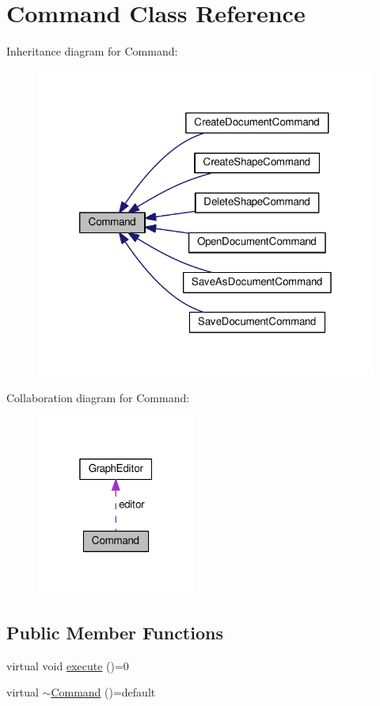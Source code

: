 \hypertarget{class_command}{\section{Command Class Reference}
\label{class_command}
}


Inheritance diagram for Command\-:
\nopagebreak
\begin{figure}[H]
\begin{center}
\leavevmode
\includegraphics[width=320pt]{class_command__inherit__graph}
\end{center}
\end{figure}


Collaboration diagram for Command\-:
\nopagebreak
\begin{figure}[H]
\begin{center}
\leavevmode
\includegraphics[width=148pt]{class_command__coll__graph}
\end{center}
\end{figure}
\subsection*{Public Member Functions}
\begin{DoxyCompactItemize}
\item 
virtual void \hyperlink{class_command_a6fd7d9bd8df8bfc881e4d6c7cd1878b7}{execute} ()=0
\item 
virtual \hyperlink{class_command_aa545a53d35818f9efb936daf3fa16c61}{$\sim$\-Command} ()=default
\end{DoxyCompactItemize}
